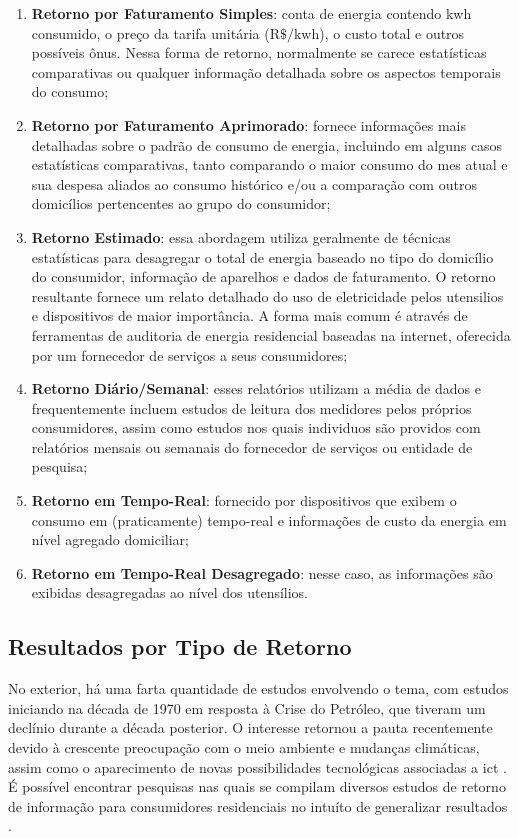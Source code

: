 \begin{enumerate}
\item \textbf{Retorno por Faturamento Simples}: conta de energia contendo 
k\acs{wh} 
consumido, o preço da tarifa unitária ($\text{R\$}/$k\acs{wh}), o custo 
total e outros possíveis ônus. Nessa forma de retorno, normalmente se carece 
estatísticas comparativas ou qualquer informação detalhada sobre os aspectos 
temporais do consumo;
\item \textbf{Retorno por Faturamento Aprimorado}: fornece informações mais 
detalhadas
sobre o padrão de consumo de energia, incluindo em alguns casos estatísticas
comparativas, tanto comparando o maior consumo do mes atual e sua despesa
aliados ao consumo histórico e/ou a comparação com outros domicílios
pertencentes ao grupo do consumidor;
\item \textbf{Retorno Estimado}: essa abordagem utiliza geralmente de técnicas
estatísticas para desagregar o total de energia baseado no tipo do
domicílio do consumidor, informação de aparelhos e dados de faturamento. O
retorno resultante fornece um relato detalhado do uso de eletricidade pelos
utensilios e dispositivos de maior importância. A forma mais comum é através de
ferramentas de auditoria de energia residencial baseadas na internet, oferecida
por um fornecedor de serviços a seus consumidores;
\item \textbf{Retorno Diário/Semanal}: esses relatórios utilizam a média de
dados e frequentemente incluem estudos de leitura dos medidores pelos próprios 
consumidores, assim como estudos nos quais individuos são providos com
relatórios mensais ou semanais do fornecedor de serviços ou entidade de
pesquisa;
\item \textbf{Retorno em Tempo-Real}: fornecido por dispositivos que exibem o
consumo em (praticamente) tempo-real e informações de custo da energia em nível
agregado domiciliar;
\item \textbf{Retorno em Tempo-Real Desagregado}: nesse caso, as informações são
exibidas desagregadas ao nível dos utensílios.
\end{enumerate}

\subsection{Resultados por Tipo de Retorno}
\label{ssec:ret_eff}

No exterior, há uma farta quantidade de estudos envolvendo o tema, com estudos iniciando na
década de 1970 em resposta à Crise do Petróleo, que tiveram um declínio durante
a década posterior. O interesse retornou a pauta recentemente devido à crescente 
preocupação com o meio ambiente e mudanças climáticas, assim 
como o aparecimento de novas possibilidades tecnológicas 
associadas a \gls{ict} \cite{aceee_2010_estudos_feedback}. É
possível encontrar pesquisas nas quais se compilam diversos estudos
de retorno de informação para consumidores residenciais no intuíto de generalizar 
resultados \cite{aceee_2010_estudos_feedback,2011_zhifeng_smart_energy_savings,
2006_darby,2009_nber_studies_us,ucla_studies_1975_2011_usa}.

